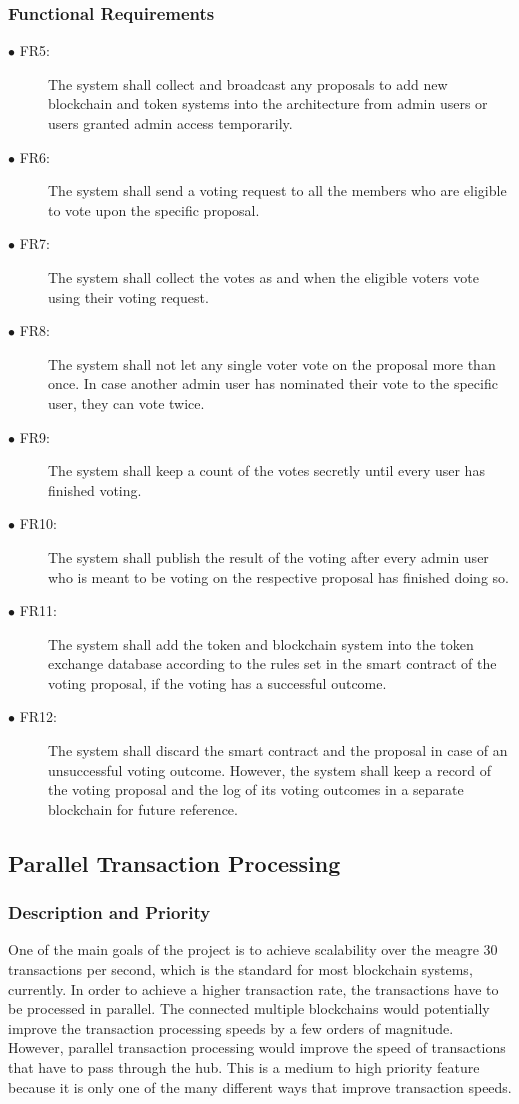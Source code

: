 \documentclass[a4paper,twoside,phd]{BYUPhys}
\begin{document}
\subsubsection{Functional Requirements}
\begin{description}
\item[$\bullet$ FR5:] The system shall collect and broadcast any proposals to add new blockchain and token systems into the architecture from admin users or users granted admin access temporarily.
\item[$\bullet$ FR6:] The system shall send a voting request to all the members who are eligible to vote upon the specific proposal.
\item[$\bullet$ FR7:] The system shall collect the votes as and when the eligible voters vote using their voting request.
\item[$\bullet$ FR8:] The system shall not let any single voter vote on the proposal more than once. In case another admin user has nominated their vote to the specific user, they can vote twice.
\item[$\bullet$ FR9:] The system shall keep a count of the votes secretly until every user has finished voting.
\item[$\bullet$ FR10:] The system shall publish the result of the voting after every admin user who is meant to be voting on the respective proposal has finished doing so.
\item[$\bullet$ FR11:] The system shall add the token and blockchain system into the token exchange database according to the rules set in the smart contract of the voting proposal, if the voting has a successful outcome.
\item[$\bullet$ FR12:] The system shall discard the smart contract and the proposal in case of an unsuccessful voting outcome. However, the system shall keep a record of the voting proposal and the log of its voting outcomes in a separate blockchain for future reference.
\end{description}
\subsection{Parallel Transaction Processing}
\subsubsection{Description and Priority}
One of the main goals of the project is to achieve scalability over the meagre 30 transactions per second\cite{GavinWood2018POLKADOT:FRAMEWORK}, which is the standard for most blockchain systems, currently. In order to achieve a higher transaction rate, the transactions have to be processed in parallel. The connected multiple blockchains would potentially improve the transaction processing speeds by a few orders of magnitude. However, parallel transaction processing would improve the speed of transactions that have to pass through the hub. This is a medium to high priority feature because it is only one of the many different ways that improve transaction speeds. 
\end{document}
